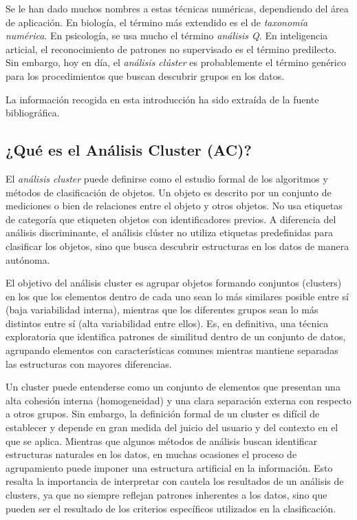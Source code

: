 Se le han dado muchos nombres a estas técnicas numéricas, dependiendo del área de aplicación. En biología, el término más extendido es el de \textit{taxonomía numérica}.
En psicología, se usa mucho el término \textit{análisis Q}. En inteligencia articial, el reconocimiento de patrones no supervisado es el término predilecto. Sin embargo,
hoy en día, el \textit{análisis clúster} es probablemente el término genérico para los procedimientos que buscan descubrir grupos en los datos. \newline

La información recogida en esta introducción ha sido extraída de la fuente bibliográfica\cite{clustering-2}. %

\subsection{¿Qué es el Análisis Cluster (AC)?}

El \textit{análisis cluster} puede definirse como el estudio formal de los algoritmos y métodos de clasificación de objetos. Un objeto es descrito por un conjunto de mediciones o
bien de relaciones entre el objeto y otros objetos. No usa etiquetas de categoría que etiqueten objetos con identificadores previos. A diferencia del análisis discriminante, el 
análisis clúster no utiliza etiquetas predefinidas para clasificar los objetos, sino que busca descubrir estructuras en los datos de manera autónoma. \newline

El objetivo del análisis cluster es agrupar objetos formando conjuntos (clusters) en los que los elementos dentro de cada uno sean lo más similares posible entre sí (baja 
variabilidad interna), mientras que los diferentes grupos sean lo más distintos entre sí (alta variabilidad entre ellos). Es, en definitiva, una técnica exploratoria que 
identifica patrones de similitud dentro de un conjunto de datos, agrupando elementos con características comunes mientras mantiene separadas 
las estructuras con mayores diferencias\cite{bejar-AC}.\newline %

Un cluster puede entenderse como un conjunto de elementos que presentan una alta cohesión interna (homogeneidad) y una clara separación externa con respecto a otros grupos. 
Sin embargo, la definición formal de un cluster es difícil de establecer y depende en gran medida del juicio del usuario y del contexto en el que se aplica. Mientras que 
algunos métodos de análisis buscan identificar estructuras naturales en los datos, en muchas ocasiones el proceso de agrupamiento puede imponer una estructura artificial 
en la información. Esto resalta la importancia de interpretar con cautela los resultados de un análisis de clusters, ya que no siempre reflejan patrones inherentes a los 
datos, sino que pueden ser el resultado de los criterios específicos utilizados en la clasificación\cite{clustering-2}. \newline %

